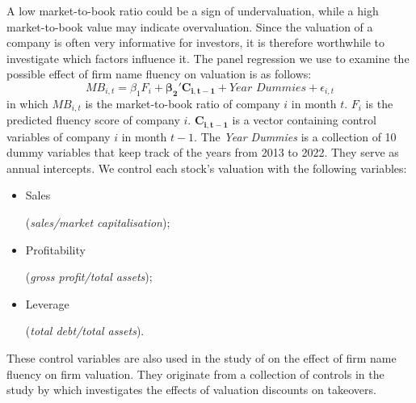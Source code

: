 \documentclass[11pt]{article}
\begin{document}
A low market-to-book ratio could be a sign of undervaluation, while a high market-to-book value may indicate overvaluation. Since the valuation of a company is often very informative for investors, it is therefore worthwhile to investigate which factors influence it. 
The panel regression we use to examine the possible effect of firm name fluency on valuation is as follows:
\begin{equation}
    MB_{i,t} = \beta_1F_{i} + \boldsymbol{\beta_2'C_{i,t-1}} + \textit{Year Dummies} + \epsilon_{i,t}
\end{equation}
in which $MB_{i,t}$ is the market-to-book ratio of company $i$ in month $t$. $F_{i}$ is the predicted fluency score of company $i$. $\boldsymbol{C_{i,t-1}}$ is a vector containing control variables of company $i$ in month $t-1$. The \textit{Year Dummies} is a collection of 10 dummy variables that keep track of the years from 2013 to 2022. They serve as annual intercepts. We control each stock's valuation with the following variables:

\vspace{0.25cm}
\begin{itemize}
\setlength\itemsep{-0.5em}
    \item \begin{minipage}[t]{0.25\textwidth}
            Sales
        \end{minipage}
        \begin{minipage}[t]{0.5\textwidth}
            (\textit{sales/market capitalisation});
        \end{minipage}
        
    \item \begin{minipage}[t]{0.25\textwidth}
            Profitability
        \end{minipage}
        \begin{minipage}[t]{0.45\textwidth}
            (\textit{gross profit/total assets});
        \end{minipage}

    \item \begin{minipage}[t]{0.25\textwidth}
            Leverage
        \end{minipage}
        \begin{minipage}[t]{0.45\textwidth}
            (\textit{total debt/total assets}).
        \end{minipage}
\end{itemize}
\noindent
These control variables are also used in the study of \cite{green2013company} on the effect of firm name fluency on firm valuation. They originate from a collection of controls in the study by \cite{edmans2012real} which investigates the effects of valuation discounts on takeovers.
\end{document}

